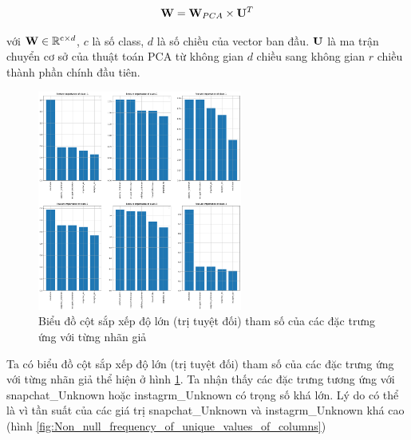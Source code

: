 \begin{enumerate}[label=(\alph*)]
    \begin{equation*}
        \bold{W} =   \bold{W}_{PCA} \times \bold{U}^T
    \end{equation*}

    với $\bold{W} \in \mathbb{R}^{\mathrm{c} \times d}$, $c$ là số class, $d$ là số chiều của vector ban đầu.
    $\bold{U}$ là ma trận chuyển cơ sở của thuật toán PCA từ không gian $d$ chiều sang không gian $r$ chiều thành phần chính đầu tiên.

    \begin{figure}[H]
        \centering
        \includegraphics[width=0.6\textwidth]{figures/Thanh/Data_Analysis/Non_null_Feature_Importance_Logistic_PCA_features.png}
        \caption{Biểu đồ cột sắp xếp độ lớn (trị tuyệt đối) tham số của các đặc trưng ứng với từng nhãn giả}
        \label{fig:Non_null_Feature_Importance_Logistic_PCA_features}
    \end{figure}

    Ta có biểu đồ cột sắp xếp độ lớn (trị tuyệt đối) tham số của các đặc trưng ứng với từng nhãn giả thể hiện ở hình \ref{fig:Non_null_Feature_Importance_Logistic_PCA_features}.
    Ta nhận thấy các đặc trưng tương ứng với snapchat\_Unknown hoặc instagrm\_Unknown có trọng số khá lớn.
    Lý do có thể là vì tần suất của các giá trị snapchat\_Unknown và instagrm\_Unknown khá cao (hình \ref{fig:Non_null_frequency_of_unique_values_of_columns})


\end{enumerate}
